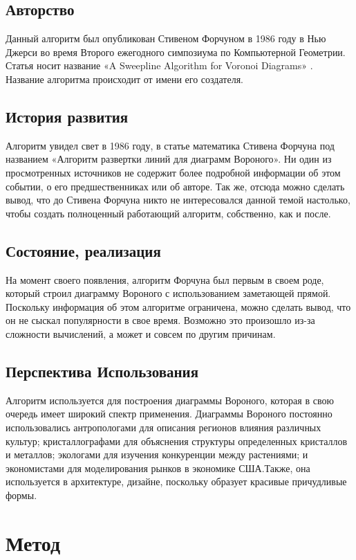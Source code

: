 \documentclass[ a4paper]{article}
\begin{document}
\subsection{Авторство}
Данный алгоритм был опубликован Стивеном Форчуном в 1986 году в Нью Джерси во время Второго ежегодного симпозиума по Компьютерной Геометрии. Статья носит название «A Sweepline Algorithm for Voronoi Diagrams» . Название алгоритма происходит от имени его создателя.
\subsection{История развития}
Алгоритм увидел свет в 1986 году, в статье математика Стивена Форчуна под названием «Алгоритм развертки линий для диаграмм Вороного». Ни один из просмотренных источников не содержит более подробной информации об этом событии, о его предшественниках или об авторе. Так же, отсюда можно сделать вывод, что до Стивена Форчуна никто не интересовался данной темой настолько, чтобы создать полноценный работающий алгоритм, собственно, как и после.
\subsection{Состояние, реализация}
На момент своего появления, алгоритм Форчуна был первым в своем роде, который строил диаграмму Вороного с использованием заметающей прямой. Поскольку информация об этом алгоритме ограничена, можно сделать вывод, что он не сыскал популярности в свое время. Возможно это произошло из-за сложности вычислений, а может и совсем по другим причинам.
\subsection{Перспектива Использования}
Алгоритм используется для построения диаграммы Вороного, которая в свою очередь имеет широкий спектр применения. 
Диаграммы Вороного постоянно использовались антропологами для описания регионов влияния различных культур; кристаллографами для объяснения структуры определенных кристаллов и металлов; экологами для изучения конкуренции между растениями; и экономистами для моделирования рынков в экономике США.Также, она используется в архитектуре, дизайне, поскольку образует красивые причудливые формы. 
\newpage
\section{Метод}
\end{document}
